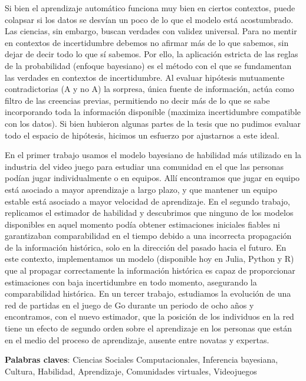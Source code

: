 \documentclass[a4paper,11pt]{book}
\theoremstyle{definition}
\begin{document}

Si bien el aprendizaje automático funciona muy bien en ciertos contextos, puede colapsar si los datos se desvían un poco de lo que el modelo está acostumbrado.
Las ciencias, sin embargo, buscan verdades con validez universal.
Para no mentir en contextos de incertidumbre debemos no afirmar más de lo que sabemos, sin dejar de decir todo lo que sí sabemos.
Por ello, la aplicación estricta de las reglas de la probabilidad (enfoque bayesiano) es el método con el que se fundamentan las verdades en contextos de incertidumbre.
Al evaluar hipótesis mutuamente contradictorias (A y no A) la sorpresa, única fuente de información, actúa como filtro de las creencias previas, permitiendo no decir más de lo que se sabe incorporando toda la información disponible (maximiza incertidumbre compatible con los datos).
Si bien hubieron algunas partes de la tesis que no pudimos evaluar todo el espacio de hipótesis, hicimos un esfuerzo por ajustarnos a este ideal.


En el primer trabajo usamos el modelo bayesiano de habilidad más utilizado en la industria del video juego para estudiar una comunidad en el que las personas podían jugar individualmente o en equipos.
Allí encontramos que jugar en equipo está asociado a mayor aprendizaje a largo plazo, y que mantener un equipo estable está asociado a mayor velocidad de aprendizaje.
En el segundo trabajo, replicamos el estimador de habilidad y descubrimos que ninguno de los modelos disponibles en aquel momento podía obtener estimaciones iniciales fiables ni garantizaban comparabilidad en el tiempo debido a una incorrecta propagación de la información histórica, solo en la dirección del pasado hacia el futuro.
En este contexto, implementamos un modelo (disponible hoy en Julia, Python y R) que al propagar correctamente la información histórica es capaz de proporcionar estimaciones con baja incertidumbre en todo momento, asegurando la comparabilidad histórica.
En un tercer trabajo, estudiamos la evolución de una red de partidas en el juego de Go durante un periodo de ocho años y encontramos, con el nuevo estimador, que la posición de los individuos en la red tiene un efecto de segundo orden sobre el aprendizaje en los personas que están en el medio del proceso de aprendizaje, ausente entre novatas y expertas.

\vspace{0.1cm}

\noindent \textbf{Palabras claves}: Ciencias Sociales Computacionales, Inferencia bayesiana, Cultura, Habilidad, Aprendizaje, Comunidades virtuales, Videojuegos
\end{document}
